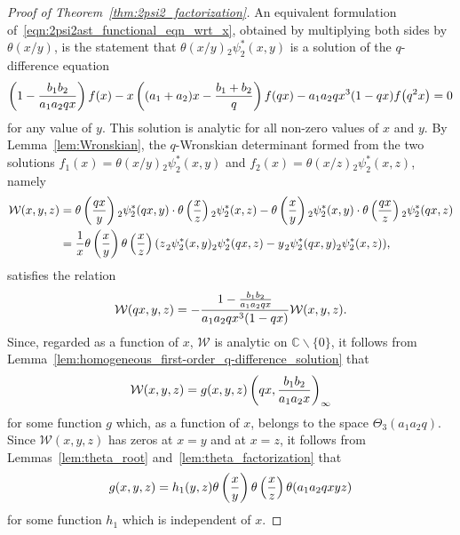 \documentclass[pdftex]{sigma}
\numberwithin{equation}{section}
\newcommand{\C}{\mathbb{C}}
\renewcommand{\sp}{\hspace{0.5pt}}
\begin{document}
\begin{proof}[Proof of Theorem~\ref{thm:2psi2_factorization}]
An equivalent formulation of~\eqref{eqn:2psi2ast_functional_eqn_wrt_x}, obtained by multiplying both sides by $\theta(x/y)$, is the statement that $\theta(x/y) {}_2^{}\psi_2^\ast(x,y)$ is a solution of the $q$-difference equation
\[ \left(1-{b_1b_2 \over a_1a_2qx}\right) f(x) - x\left( (a_1+a_2)x - {b_1+b_2 \over q} \right) f(qx) - a_1a_2qx^3 (1-qx) f\bigl(q^2x\bigr) =0 \]
for any value of $y$. This solution is analytic for all non-zero values of $x$ and $y$. By Lemma~\ref{lem:Wronskian}, the $q$-Wronskian determinant formed from the two solutions $f_1(x)=\theta(x/y) {}_2^{}\psi_2^\ast(x,y)$ and $f_2(x)=\theta(x/z) {}_2^{}\psi_2^\ast(x,z)$, namely
\begin{align}
\mathcal{W}(x,y,z) &= \theta\left( {qx \over y} \right) {}_2^{}\psi_2^\ast(qx,y) \cdot \theta\left( {x \over z} \right) {}_2^{}\psi_2^\ast(x,z) - \theta\left( {x \over y} \right) {}_2^{}\psi_2^\ast(x,y) \cdot \theta\left( {qx \over z} \right) {}_2^{}\psi_2^\ast(qx,z) \nonumber \\
&= {1 \over x}\theta\left( {x \over y} \right) \theta\left( {x \over z} \right) ( z \sp {}_2^{}\psi_2^\ast(x,y) {}_2^{}\psi_2^\ast(qx,z) - y \sp {}_2^{}\psi_2^\ast(qx,y){}_2^{}\psi_2^\ast(x,z) ), \label{eqn:2psi2_Wronskian_def}
\end{align}
satisfies the relation
\[ \mathcal{W}(qx,y,z) = -{1-{b_1b_2 \over a_1a_2qx} \over a_1a_2qx^3(1-qx)} \mathcal{W}(x,y,z). \]
Since, regarded as a function of $x$, $\mathcal{W}$ is analytic on $\C \backslash \{0\}$, it follows from Lemma~\ref{lem:homogeneous_first-order_q-difference_solution} that
\[ \mathcal{W}(x,y,z) = g(x,y,z) \left(qx,{b_1b_2 \over a_1a_2x}\right)_{ \infty} \]
for some function $g$ which, as a function of $x$, belongs to the space $\Theta_3(a_1a_2q)$. Since $\mathcal{W}(x,y,z)$ has zeros at $x=y$ and at $x=z$, it follows from Lemmas~\ref{lem:theta_root} and~\ref{lem:theta_factorization} that
\begin{equation} \label{eqn:initial_2psi2_Wronskian_factorization}
g(x,y,z) = h_1(y,z) \theta\left( {x \over y} \right) \theta\left( {x \over z} \right) \theta(a_1a_2qxyz)
\end{equation}
for some function $h_1$ which is independent of $x$.


\end{proof}
\end{document}
